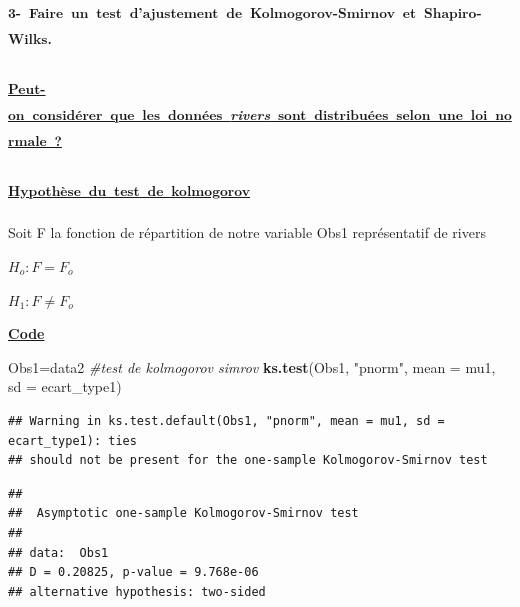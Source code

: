\documentclass[
]{article}
\newenvironment{Shaded}{\begin{snugshade}}{\end{snugshade}}
\newcommand{\AttributeTok}[1]{\textcolor[rgb]{0.13,0.29,0.53}{#1}}
\newcommand{\CommentTok}[1]{\textcolor[rgb]{0.56,0.35,0.01}{\textit{#1}}}
\newcommand{\FunctionTok}[1]{\textcolor[rgb]{0.13,0.29,0.53}{\textbf{#1}}}
\newcommand{\NormalTok}[1]{#1}
\newcommand{\OtherTok}[1]{\textcolor[rgb]{0.56,0.35,0.01}{#1}}
\newcommand{\StringTok}[1]{\textcolor[rgb]{0.31,0.60,0.02}{#1}}
\begin{document}
\subsubsection{\texorpdfstring{\textsuperscript{3-~Faire~un~test~d'ajustement~de~Kolmogorov-Smirnov~et~Shapiro-Wilks.}}{3-~Faire~un~test~d'ajustement~de~Kolmogorov-Smirnov~et~Shapiro-Wilks.}}\label{faire-un-test-dajustement-de-kolmogorov-smirnov-et-shapiro-wilks.}

\subsubsection{\texorpdfstring{\textsuperscript{\ul{Peut-on~considérer~que~les~données~\emph{rivers}~sont~distribuées~selon~une~loi~normale~?}}}{Peut-on~considérer~que~les~données~rivers~sont~distribuées~selon~une~loi~normale~?}}\label{peut-on-considuxe9rer-que-les-donnuxe9es-rivers-sont-distribuuxe9es-selon-une-loi-normale}

\subsubsection{\texorpdfstring{\textsuperscript{\ul{Hypothèse~du~test~de~kolmogorov}}}{Hypothèse~du~test~de~kolmogorov}}\label{hypothuxe8se-du-test-de-kolmogorov}

Soit F la fonction de répartition de notre variable Obs1 représentatif
de rivers

\(H_o:F=F_o\)

\(H_1:F \neq F_o\)

\ul{\textbf{Code}}

\begin{Shaded}
\begin{Highlighting}[]
\NormalTok{Obs1}\OtherTok{=}\NormalTok{data2}
\CommentTok{\#test de kolmogorov simrov}
\FunctionTok{ks.test}\NormalTok{(Obs1, }\StringTok{"pnorm"}\NormalTok{, }\AttributeTok{mean =}\NormalTok{ mu1, }\AttributeTok{sd =}\NormalTok{ ecart\_type1)}
\end{Highlighting}
\end{Shaded}

\begin{verbatim}
## Warning in ks.test.default(Obs1, "pnorm", mean = mu1, sd = ecart_type1): ties
## should not be present for the one-sample Kolmogorov-Smirnov test
\end{verbatim}

\begin{verbatim}
## 
##  Asymptotic one-sample Kolmogorov-Smirnov test
## 
## data:  Obs1
## D = 0.20825, p-value = 9.768e-06
## alternative hypothesis: two-sided
\end{verbatim}
\end{document}
